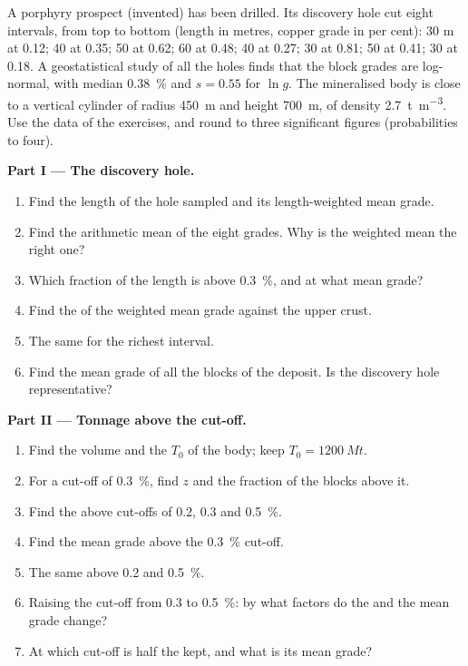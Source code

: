 \begin{problem}\label{pb:b2:ore-deposits:1}
A porphyry prospect (invented) has been drilled. Its discovery hole cut eight intervals, from top
to bottom (length in metres, copper grade in per cent): 30 m at 0.12; 40 at 0.35; 50 at 0.62; 60
at 0.48; 40 at 0.27; 30 at 0.81; 50 at 0.41; 30 at 0.18. A geostatistical study of all the holes
finds that the block grades are log-normal, with median \qty{0.38}{\percent} and $s = 0.55$ for
$\ln g$. The mineralised body is close to a vertical cylinder of radius \qty{450}{m} and height
\qty{700}{m}, of density \qty{2.7}{t.m^{-3}}. Use the data of the exercises, and round to three
significant figures (probabilities to four).

\noindent\textbf{Part I --- The discovery hole.}
\begin{enumerate}
  \item Find the length of the hole sampled and its length-weighted mean grade.
  \item Find the arithmetic mean of the eight grades. Why is the weighted mean the right one?
  \item Which fraction of the length is above \qty{0.3}{\percent}, and at what mean grade?
  \item Find the  of the weighted mean grade against the upper crust.
  \item The same for the richest interval.
  \item Find the mean grade of all the blocks of the deposit. Is the discovery hole representative?
\end{enumerate}

\noindent\textbf{Part II --- Tonnage above the cut-off.}
\begin{enumerate}[resume]
  \item Find the volume and the  $T_0$ of the body; keep $T_0 = \qty{1200}{Mt}$.
  \item For a cut-off of \qty{0.3}{\percent}, find $z$ and the fraction of the blocks above it.
  \item Find the  above cut-offs of 0.2, 0.3 and \qty{0.5}{\percent}.
  \item Find the mean grade above the \qty{0.3}{\percent} cut-off.
  \item The same above 0.2 and \qty{0.5}{\percent}.
  \item Raising the cut-off from 0.3 to \qty{0.5}{\percent}: by what factors do the  and the
        mean grade change?
  \item At which cut-off is half the  kept, and what is its mean grade?
\end{enumerate}


\end{problem}
